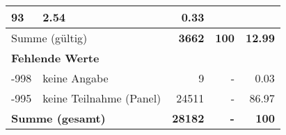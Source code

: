 \begin{longtable}{lXrrr}
       \num{93} &
       \num[round-mode=places,round-precision=2]{2,54} &
         \num[round-mode=places,round-precision=2]{0,33} \\
     \midrule
     \multicolumn{2}{l}{Summe (gültig)} &
       \textbf{\num{3662}} &
     \textbf{100} &
       \textbf{\num[round-mode=places,round-precision=2]{12,99}} \\
     \multicolumn{5}{l}{\textbf{Fehlende Werte}}\\
       -998 &
       keine Angabe &
         \num{9} &
        - &
         \num[round-mode=places,round-precision=2]{0,03} \\
       -995 &
       keine Teilnahme (Panel) &
         \num{24511} &
        - &
         \num[round-mode=places,round-precision=2]{86,97} \\
     \midrule
     \multicolumn{2}{l}{\textbf{Summe (gesamt)}} &
          \textbf{\num{28182}} &
        \textbf{-} &
        \textbf{100} \\
     \bottomrule
     \end{longtable}
     
